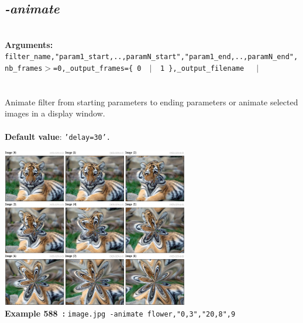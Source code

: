 \documentclass[a4paper,11pt,twoside]{book}
\begin{document}
\subsection{\emph{-animate} }\vspace*{-0.5em}
~\\\textbf{Arguments: } 
{\small \texttt{filter\_name,"param1\_start,..,paramN\_start","param1\_end,..,paramN\_end",nb\_frames$>$=0,\_output\_frames=\{ 0 ~$|$~ 1 \},\_output\_filename}}~~~$|$\\
\\~\\
Animate filter from starting parameters to ending parameters or animate selected images
in a display window.
~\\~\\\textbf{Default value}: {\small \texttt{'delay=30'.}}
\begin{center}\includegraphics[keepaspectratio=true,height=7cm,width=\textwidth]{img/gmic_def588.jpg}\\
{\footnotesize \textbf{Example 588~:} \texttt{image.jpg -animate flower,"0,3","20,8",9}}
\end{center}
\end{document}
